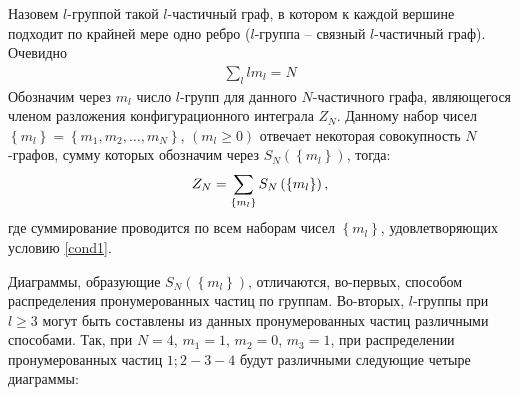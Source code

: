 Назовем $l$-группой такой $l$-частичный граф, в котором к каждой вершине подходит по крайней мере одно ребро ($l$-группа -- связный $l$-частичный граф). Очевидно
\vverh
\begin{gather}
	\sum_l l m_l = N \label{cond1}
\end{gather}
Обозначим через $m_l$ число $l$-групп для данного $N$-частичного графа, являющегося членом разложения конфигурационного интеграла $Z_N$. Данному набор чисел $\left\{ m_l \right\} = \left\{ m_1 , m_2 , \dots, m_N \right\}$, $( m_l \geqslant 0 )$ отвечает некоторая совокупность $N$-графов, сумму которых обозначим через $S_N \left( \left\{ m_l \right\} \right)$, тогда:
\vverh
\begin{gather}
	Z_N = \sum_{ \left\{ m_l \right\} } S_N \left( \left\{ m_l \right\} \right), \notag
\end{gather}
где суммирование проводится по всем наборам чисел $\left\{ m_l \right\}$, удовлетворяющих условию \eqref{cond1}. \par
Диаграммы, образующие $S_N \left( \left\{ m_l \right\} \right)$, отличаются, во-первых, способом распределения пронумерованных частиц по группам. Во-вторых, $l$-группы при $l \geqslant 3$ могут быть составлены из данных пронумерованных частиц различными способами. Так, при $N=4$, $m_1 = 1$, $m_2 = 0$, $m_3 = 1$, при распределении пронумерованных частиц $1; 2-3-4$ будут различными следующие четыре диаграммы:
\vverh
